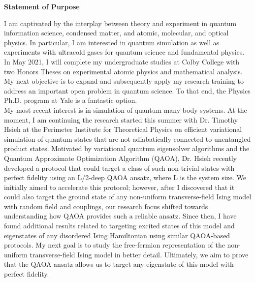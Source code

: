 \documentclass[12pt]{article}
\begin{document}
\begin{center}
	\textbf{Statement of Purpose}
\end{center}
I am captivated by the interplay between theory and experiment in quantum information science, condensed matter, and atomic, molecular, and optical physics. In particular, I am interested in  quantum simulation as well as experiments with ultracold gases for quantum science and fundamental physics. In May 2021, I will complete my undergraduate studies at Colby College with two Honors Theses on experimental atomic physics and mathematical analysis. My next objective is to expand and subsequently apply my research training to address an important open problem in quantum science. To that end, the Physics Ph.D. program at Yale is a fantastic option.  \\ 

My most recent interest is in simulation of quantum many-body systems. At the moment, I am continuing the research started this summer with Dr. Timothy Hsieh at the Perimeter Institute for Theoretical Physics on efficient variational simulation of quantum states that are not adiabatically connected to unentangled product states. Motivated by variational quantum eigensolver algorithms and the Quantum Approximate Optimization Algorithm (QAOA), Dr. Hsieh recently developed a protocol that could target a class of such non-trivial  states with perfect fidelity using an L/2-deep QAOA ansatz, where L is the system size. We initially aimed to accelerate this protocol; however, after I discovered that it could also target the ground state of any non-uniform transverse-field Ising model with random field and couplings, our research focus shifted towards understanding how QAOA provides such a reliable ansatz. Since then, I have found additional results related to targeting excited states of this model and eigenstates of any disordered Ising Hamiltonian using similar QAOA-based protocols. My next goal is to study the free-fermion representation of the non-uniform transverse-field Ising model in better detail. Ultimately, we aim to prove that the QAOA ansatz allows us to target any eigenstate of this model with perfect fidelity. \\
\end{document}
